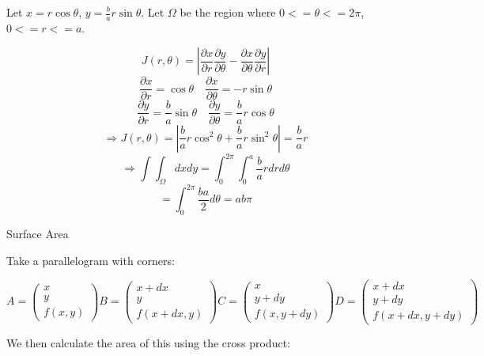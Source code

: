 \documentclass[a4paper,10pt]{article}
\begin{document}
\begin{ex}[Ellipse]
	Let $x = r\cos\theta$, $y = \frac{b}{a}r\sin\theta$. Let $\Omega$ be the
	region where $0 <= \theta <= 2\pi$, $0 <= r <= a$.

	\[
		J(r,\theta) = \left| \frac{\partial x}{\partial r}
		\frac{\partial y}{\partial \theta} -
		\frac{\partial x}{\partial \theta}
		\frac{\partial y}{\partial r} \right|
	\]
	\[
		\frac{\partial x}{\partial r} = \cos\theta
		\quad
		\frac{\partial x}{\partial \theta} = -r \sin\theta
	\]
	\[
		\frac{\partial y}{\partial r} = \frac{b}{a} \sin\theta
		\quad
		\frac{\partial y}{\partial \theta} = \frac{b}{a}r \cos\theta
	\]
	\[
		\Rightarrow J(r,\theta) = \left| \frac{b}{a}r \cos^2\theta +
		\frac{b}{a}r \sin^2\theta \right| = \frac{b}{a}r
	\]
	\[
		\Rightarrow \int\int_{\Omega} dxdy =
		\int_0^{2\pi} \int_0^a \frac{b}{a}r drd\theta
	\]
	\[
		= \int_0^{2\pi} \frac{ba}{2} d\theta = ab\pi
	\]
\end{ex}

Surface Area

Take a parallelogram with corners:

\[
	A = \begin{pmatrix}
		x \\
		y \\
		f(x,y)
	\end{pmatrix}
	B = \begin{pmatrix}
		x+dx \\
		y \\
		f(x+dx,y)
	\end{pmatrix}
	C = \begin{pmatrix}
		x \\
		y+dy \\
		f(x,y+dy)
	\end{pmatrix}
	D = \begin{pmatrix}
		x+dx \\
		y+dy \\
		f(x+dx,y+dy)
	\end{pmatrix}
\]

We then calculate the area of this using the cross product:
\end{document}
